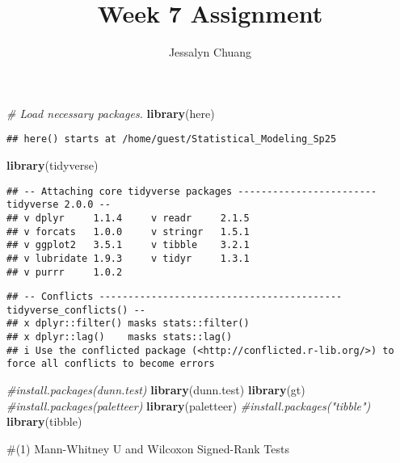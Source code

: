 \documentclass[
]{article}
\title{Week 7 Assignment}
\author{Jessalyn Chuang}
\date{}
\newenvironment{Shaded}{\begin{snugshade}}{\end{snugshade}}
\newcommand{\CommentTok}[1]{\textcolor[rgb]{0.56,0.35,0.01}{\textit{#1}}}
\newcommand{\FunctionTok}[1]{\textcolor[rgb]{0.13,0.29,0.53}{\textbf{#1}}}
\newcommand{\NormalTok}[1]{#1}
\begin{document}
\maketitle

\begin{Shaded}
\begin{Highlighting}[]
\CommentTok{\# Load necessary packages.}
\FunctionTok{library}\NormalTok{(here)}
\end{Highlighting}
\end{Shaded}

\begin{verbatim}
## here() starts at /home/guest/Statistical_Modeling_Sp25
\end{verbatim}

\begin{Shaded}
\begin{Highlighting}[]
\FunctionTok{library}\NormalTok{(tidyverse)}
\end{Highlighting}
\end{Shaded}

\begin{verbatim}
## -- Attaching core tidyverse packages ------------------------ tidyverse 2.0.0 --
## v dplyr     1.1.4     v readr     2.1.5
## v forcats   1.0.0     v stringr   1.5.1
## v ggplot2   3.5.1     v tibble    3.2.1
## v lubridate 1.9.3     v tidyr     1.3.1
## v purrr     1.0.2
\end{verbatim}

\begin{verbatim}
## -- Conflicts ------------------------------------------ tidyverse_conflicts() --
## x dplyr::filter() masks stats::filter()
## x dplyr::lag()    masks stats::lag()
## i Use the conflicted package (<http://conflicted.r-lib.org/>) to force all conflicts to become errors
\end{verbatim}

\begin{Shaded}
\begin{Highlighting}[]
\CommentTok{\#install.packages(\textquotesingle{}dunn.test\textquotesingle{})}
\FunctionTok{library}\NormalTok{(dunn.test)}
\FunctionTok{library}\NormalTok{(gt)}
\CommentTok{\#install.packages(\textquotesingle{}paletteer\textquotesingle{})}
\FunctionTok{library}\NormalTok{(paletteer)}
\CommentTok{\#install.packages("tibble")}
\FunctionTok{library}\NormalTok{(tibble)}
\end{Highlighting}
\end{Shaded}

\#(1) Mann-Whitney U and Wilcoxon Signed-Rank Tests
\end{document}

